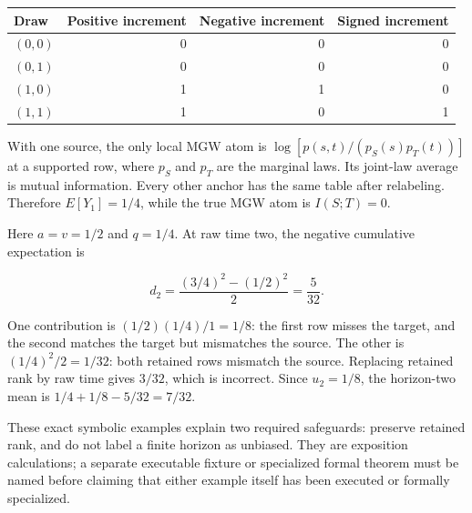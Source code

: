 {\def\LTcaptype{none} %
\begin{longtable}[]{@{}lrrr@{}}
\toprule\noalign{}
Draw & Positive increment & Negative increment & Signed increment \\
\midrule\noalign{}
\endhead
\bottomrule\noalign{}
\endlastfoot
\((0,0)\) & 0 & 0 & 0 \\
\((0,1)\) & 0 & 0 & 0 \\
\((1,0)\) & 1 & 1 & 0 \\
\((1,1)\) & 1 & 0 & 1 \\
\end{longtable}
}

With one source, the only local MGW atom is \(\log[p(s,t)/(p_S(s)p_T(t))]\) at a supported row, where \(p_S\) and \(p_T\) are the marginal laws. Its joint-law average is mutual information. Every other anchor has the same table after relabeling. Therefore \(E[Y_1]=1/4\), while the true MGW atom is \(I(S;T)=0\).

Here \(a=v=1/2\) and \(q=1/4\). At raw time two, the negative cumulative expectation is

\[
d_2=\frac{(3/4)^2-(1/2)^2}{2}=\frac5{32}.
\]

One contribution is \((1/2)(1/4)/1=1/8\): the first row misses the target, and the second matches the target but mismatches the source. The other is \((1/4)^2/2=1/32\): both retained rows mismatch the source. Replacing retained rank by raw time gives \(3/32\), which is incorrect. Since \(u_2=1/8\), the horizon-two mean is \(1/4+1/8-5/32=7/32\).

These exact symbolic examples explain two required safeguards: preserve retained rank, and do not label a finite horizon as unbiased. They are exposition calculations; a separate executable fixture or specialized formal theorem must be named before claiming that either example itself has been executed or formally specialized.

\label{edge-cases-and-permitted-interpretations}

